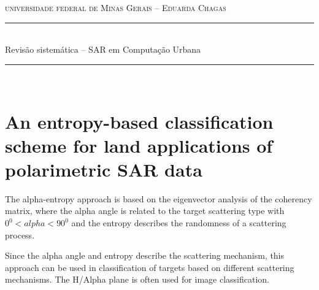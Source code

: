 \documentclass[paper=a4, fontsize=11pt]{scrartcl}
\newcommand{\horrule}[1]{\rule{\linewidth}{#1}}
\newcommand{\comment}[1]{}
\begin{document}
\normalfont \normalsize 
\hspace{2.3cm} \textsc{universidade federal de Minas Gerais -- Eduarda Chagas}\\[25pt]
\horrule{0.5pt} \\[0.5cm]
\indent \huge Revisão sistemática -- SAR em Computação Urbana\\ 
\horrule{2pt} \\[0.5cm]
\normalfont \normalsize 
\comment{
\section*{1 -- A Review of PolSAR Image Classification: From Polarimetry to Deep Learning}

This paper presents a review of the classification techniques of terrain regions.

\begin{itemize}
    \item Autores:~\cite{Wang2019Review}
    \item Data de publicação: Aug. 2019
    \item Técnica utilizada: The network structure and training algorithm of real-valued convolutional neural network (RV-CNN) and complex-valued neural network (CV-NN).
    \item Foco do artigo: In this paper, the neural network algorithm and PolSAR data characteristics are combined and studied to improve the performance of terrain classification.
\end{itemize}

\newpage
}

\section*{An entropy-based classification scheme for land applications of polarimetric SAR data}

The alpha-entropy approach is based on the eigenvector analysis of the coherency matrix, where the alpha angle is related to the target scattering type with $0^0 < alpha < 90^0$ and the entropy describes the randomness of a scattering process. 

Since the alpha angle and entropy describe the scattering mechanism, this approach can be used in classification of targets based on different scattering mechanisms. 
The H/Alpha plane is often used for image classification.
\end{document}
